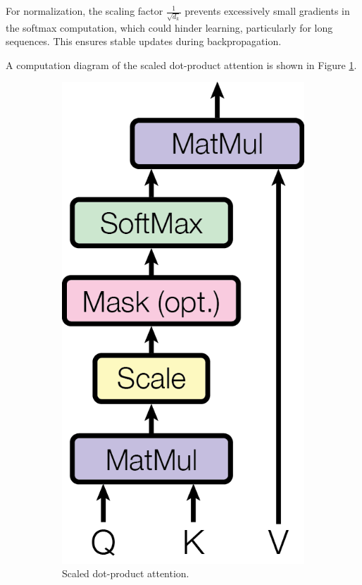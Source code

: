 For normalization, the scaling factor $\frac{1}{\sqrt{d_k}}$ prevents excessively small gradients in the softmax computation, which could hinder learning, particularly for long sequences. This ensures stable updates during backpropagation.


A computation diagram of the scaled dot-product attention is shown in Figure \ref{fig:subfig-a}.
\newline


\begin{figure}[h]
    \centering
    \begin{subfigure}[b]{0.45\textwidth}
        \centering
        \includegraphics[width=0.6\linewidth]{obrazky-figures/scaleddotattn.png}
        \caption{Scaled dot-product attention.}
        \label{fig:subfig-a}
    \end{subfigure}
    \hfill
    \begin{subfigure}[b]{0.45\textwidth}
        \centering

\end{subfigure}
\end{figure}
